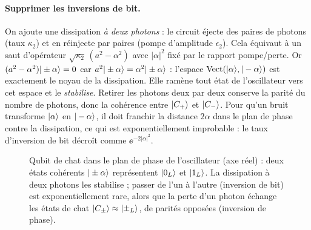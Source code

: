 \paragraph{Supprimer les inversions de bit.} On ajoute une dissipation \emph{à deux photons} : le circuit éjecte des paires de photons
(taux $\kappa_2$) et en réinjecte par paires (pompe d'amplitude $\epsilon_2$). Cela équivaut à un saut d'opérateur
$\sqrt{\kappa_2}\,(a^2-\alpha^2)$ avec $|\alpha|^2$ fixé par le rapport pompe/perte. Or $(a^2-\alpha^2)|\pm\alpha\rangle=0$ car
$a^2|\pm\alpha\rangle=\alpha^2|\pm\alpha\rangle$ : l'espace $\mathrm{Vect}(|\alpha\rangle,|-\alpha\rangle)$ est exactement le noyau de la dissipation. Elle ramène
tout état de l'oscillateur vers cet espace et le \emph{stabilise}. Retirer les photons deux par deux conserve la parité du nombre de photons, donc la
cohérence entre $|C_+\rangle$ et $|C_-\rangle$. Pour qu'un bruit transforme $|\alpha\rangle$ en $|-\alpha\rangle$, il doit franchir la distance $2\alpha$ dans
le plan de phase contre la dissipation, ce qui est exponentiellement improbable : le taux d'inversion de bit décroît
comme $\ee^{-2|\alpha|^2}$.

\begin{figure}[!ht]
\centering
{}
\caption{Qubit de chat dans le plan de phase de l'oscillateur (axe réel) : deux états cohérents $|\pm\alpha\rangle$ représentent $|0_L\rangle$
et $|1_L\rangle$. La dissipation à deux photons les stabilise ; passer de l'un à l'autre (inversion de bit) est exponentiellement
rare, alors que la perte d'un photon échange les états de chat $|C_\pm\rangle\approx|\pm_L\rangle$, de parités opposées (inversion de phase).}
\label{fig:chat}
\end{figure}

